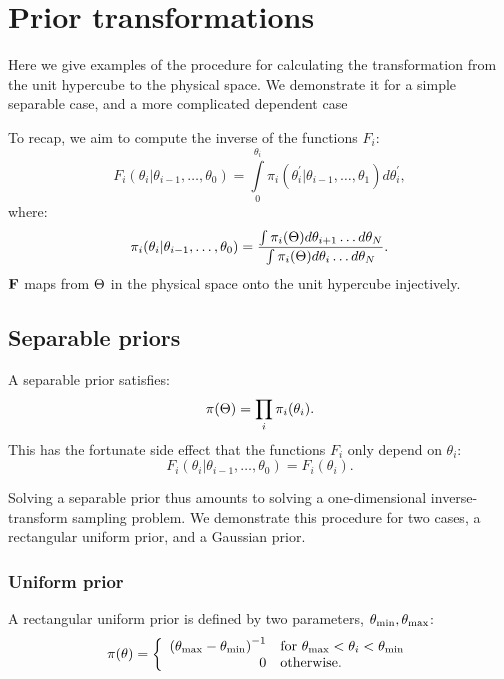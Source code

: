 \section{Prior transformations}
\label{sec:pc:prior_transformations}
Here we give examples of the procedure for calculating the transformation from the unit hypercube to the physical space. We demonstrate it for a simple separable case, and a more complicated dependent case

To recap, we aim to compute the inverse of the functions $F_i$: 
\begin{equation}
  F_i(\theta_i|\theta_{i-1},\ldots,\theta_0) = \int\limits_0^{\theta_i} \pi_i(\theta_i^\prime|\theta_{i-1},\ldots,\theta_1) d\theta_i^\prime,
  \label{eqn:pc:appFi}
\end{equation}
%
where:
%
\begin{equation}
  \pi_i(\theta_i|\theta_{i-1},\ldots,\theta_0) 
  =
  \frac{%
    \int \pi_i(\params) d\theta_{i+1}\ldots d\theta_{N}
  }{%
    \int \pi_i(\params) d\theta_{i}\ldots d\theta_{N}
  }.
  \label{eqn:pc:apppii}
\end{equation}
$\mathbf{F}$ maps from $\Theta$ in the physical space onto the unit hypercube injectively. 



\subsection{Separable priors}
\label{sec:pc:separable_priors}
A separable prior satisfies:
\begin{equation}
  \pi(\Theta) = \prod_i\pi_i(\theta_i).
  \label{eqn:pc:separability}
\end{equation}
This has the fortunate side effect that the functions $F_i$ only depend on $\theta_i$:
\begin{equation}
  F_i(\theta_i|\theta_{i-1},\ldots,\theta_0) = F_i(\theta_i).
\end{equation}

Solving a separable prior thus amounts to solving a one-dimensional inverse-transform sampling problem. We demonstrate this procedure for two cases, a rectangular uniform prior, and a Gaussian prior.

\subsubsection{Uniform prior}
\label{sec:pc:uniform_prior}
\newcommand{\thetamin}{\theta_\smin} %
\newcommand{\thetamax}{\theta_\smax} %
A rectangular uniform prior is defined by two parameters, ${\thetamin,\thetamax}$:
\begin{equation}
  \pi(\theta) = 
  \left\{
    \begin{array}{rl}
      {(\thetamax - \thetamin)}^{-1} 
      &
      \text{for }\thetamax<\theta_i<\thetamin \\
      0 & \text{otherwise.}
    \end{array}
  \right.
\label{eqn:pc:uniform_prior}
\end{equation}

